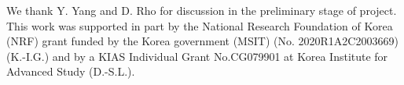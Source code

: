 \documentclass[aps,pre,twocolumn,nofootinbib,superscriptaddress,showpacs,showkeys]{revtex4-1}
\begin{document}
\begin{acknowledgments}
We thank Y. Yang and D. Rho for discussion in the preliminary stage of project.
This work was supported in part by the National Research Foundation of Korea (NRF) grant funded by the Korea government (MSIT) (No. 2020R1A2C2003669) (K.-I.G.) and by a KIAS Individual Grant No.CG079901 at Korea Institute for Advanced Study (D.-S.L.).
\end{acknowledgments}
\nocite{*}

\end{document}
